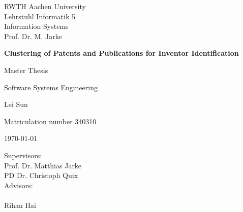 \thispagestyle{empty}


 \begin{center}
  \parbox{5.5cm}{
 \centering
 RWTH Aachen University \\
  Lehrstuhl Informatik 5 \\
  Information Systems \\
  Prof. Dr. M. Jarke}
 \end{center}



\vspace*{3cm}
\centerline{{\Large\bf Clustering of Patents and Publications for Inventor Identification}}

\vspace*{4mm}

\vspace{2cm}


\centerline{Master Thesis}
\centerline{Software Systems Engineering}

\vspace{2cm}

\centerline{{\large Lei Sun}}
\centerline{Matriculation number 340310}

\vspace{10mm}

\centerline{\today}

\vspace{10mm}

\begin{center}
\begin{minipage}[t]{8cm}
Supervisors: \\
\hspace*{2cm} Prof. Dr. Matthias Jarke \\
\hspace*{2cm} PD Dr. Christoph Quix\\[1cm]
Advisors: \\
\hspace*{2cm}  \\
\hspace*{2cm}Rihan Hai\\

\end{minipage}
\end{center}
